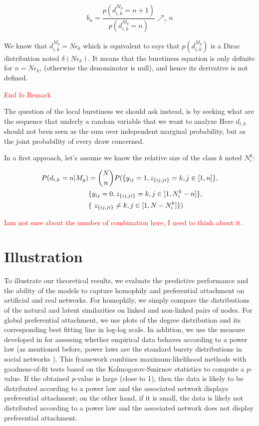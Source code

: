 \documentclass{llncs}
\begin{document}
\begin{equation}
b_n = \frac{p(d_{i,k}^{M_g} = n+1)}{p(d_{i,k}^{M_g} = n)}  \nearrow_? n 
\end{equation}

We know that $d_{i,k}^{M_g} = N \epsilon_k$ which is equivalent to says that $p(d_{i,k}^{M_g})$ is a Dirac distribution noted $\delta (N\epsilon_k)$. It means that the burstiness equation is only definite for $n = N\epsilon_k$, (otherwise the denominator is null), and hence its derivative is not defined.


\textcolor{red}{End fo Remark
\hrulefill
\hrulefill
~\\
}

The question of the local burstiness we should ask instead, is by seeking what are the sequence that underly a random variable that we want to analyze Here $d_{i,k}$ should not been seen as the sum over independent marginal probability, but as the joint probability of every draw concerned. 

In a first approach, let's assume we know the relative size of the class $k$ noted $N_i^k$:

\begin{align*}
P(d_{i,k}=n | M_g) &= \dbinom{N}{n} P(\{y_{ij}=1, z_{\{ij,ji\}}=k, j\in [1,n]\}, \\ & \{y_{ij}=0, z_{\{ij,ji\}}=k, j\in [1,N_i^k-n]\}, \\
&  \{\ z_{\{ij,ji\}}\neq k, j\in [1,N-N_i^k]\}) \\
\end{align*}


\textcolor{red}{Iam not sure about the number of combination here, I need to think about it.}

\section{Illustration}
\label{sec:exps}

To illustrate our theoretical results, we evaluate the predictive performance and the ability of the models to capture homophily and preferential attachment on artificial and real networks. For homophily, we simply compare the distributions of the natural and latent similarities on linked and non-linked pairs of nodes. For global preferential attachment, we use plots of the degree distribution and its corresponding best fitting line in log-log scale. In addition, we use the measure developed in \cite{clauset2009power} for assessing whether empirical data behaves according to a power law (as mentioned before, power laws are the standard bursty distributions in social networks \cite{barabasi1999emergence}). This framework combines maximum-likelihood methods with goodness-of-fit tests based on the Kolmogorov-Smirnov statistics to compute a $p$-value. If the obtained $p$-value is large (close to 1), then the data is likely to be distributed according to a power law and the associated network displays preferential attachment;  on the other hand, if it is small, the data is likely not distributed according to a power law and the associated network does not display preferential attachment.
\end{document}
